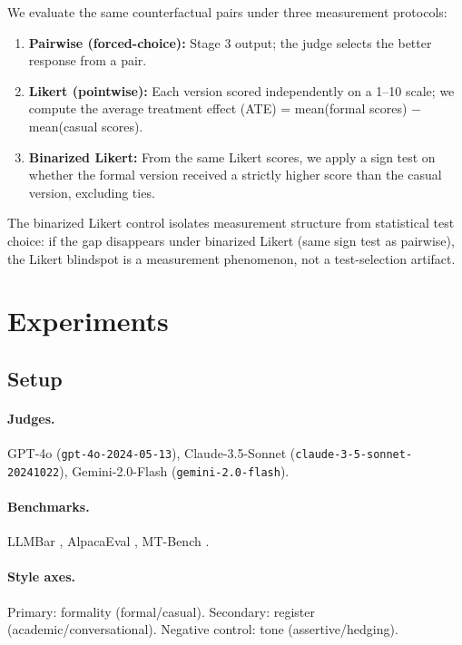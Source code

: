 \documentclass[11pt,a4paper]{article}
\begin{document}
We evaluate the same counterfactual pairs under three measurement protocols:
\begin{enumerate}[nosep,leftmargin=*]
\item \textbf{Pairwise (forced-choice):} Stage 3 output; the judge selects the better response from a pair.
\item \textbf{Likert (pointwise):} Each version scored independently on a 1--10 scale; we compute the average treatment effect (ATE) = mean(formal scores) $-$ mean(casual scores).
\item \textbf{Binarized Likert:} From the same Likert scores, we apply a sign test on whether the formal version received a strictly higher score than the casual version, excluding ties.
\end{enumerate}
The binarized Likert control isolates measurement structure from statistical test choice: if the gap disappears under binarized Likert (same sign test as pairwise), the Likert blindspot is a measurement phenomenon, not a test-selection artifact.

\section{Experiments}

\subsection{Setup}

\paragraph{Judges.} GPT-4o (\texttt{gpt-4o-2024-05-13}), Claude-3.5-Sonnet (\texttt{claude-3-5-sonnet-20241022}), Gemini-2.0-Flash (\texttt{gemini-2.0-flash}).

\paragraph{Benchmarks.} LLMBar \citep{zeng2024llmbar}, AlpacaEval \citep{dubois2024alpacafarm}, MT-Bench \citep{zheng2023judging}.

\paragraph{Style axes.} Primary: formality (formal/casual). Secondary: register (academic/conversational). Negative control: tone (assertive/hedging).
\end{document}
